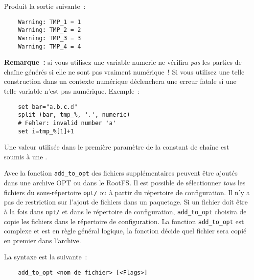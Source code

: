     Produit la sortie suivante~:

\begin{example}
\begin{verbatim}
    Warning: TMP_1 = 1
    Warning: TMP_2 = 2
    Warning: TMP_3 = 3
    Warning: TMP_4 = 4
\end{verbatim}
\end{example}

    \textbf{Remarque~:} si vous utilisez une variable \og{}numeric\fg{}  ne
	vérifira \emph{pas} les parties de chaîne générés si elle ne sont pas vraiment numérique~!
	Si vous utilisez une telle construction dans un contexte numérique 
	déclenchera une erreur fatale si une telle variable n'est pas numérique. Exemple~:

\begin{example}
\begin{verbatim}
    set bar="a.b.c.d"
    split (bar, tmp_%, '.', numeric)
    # Fehler: invalid number 'a'
    set i=tmp_%[1]+1
\end{verbatim}
\end{example}

    Une valeur utilisée dans le première paramètre de la constant de chaîne est soumis à une
	.



   Avec la fonction \texttt{add\_to\_opt} des fichiers supplémentaires peuvent
   être ajoutés dans une archive OPT ou dans le RootFS. Il est possible de sélectionner
   \emph{tous} les fichiers du sous-répertoire \texttt{opt/} ou à partir du répertoire
   de configuration. Il n'y a pas de restriction sur l’ajout de fichiers dans un paquetage.
   Si un fichier doit être à la fois dans \texttt{opt/} et dans le répertoire de configuration,
   \texttt{add\_to\_opt} choisira de copie les fichiers dans le répertoire de configuration.
   La fonction \texttt{add\_to\_opt} est complexe et est en règle général logique, la fonction
   décide quel fichier sera copié en premier dans l'archive.

   La syntaxe est la suivante~:

\begin{example}
\begin{verbatim}
    add_to_opt <nom de fichier> [<Flags>]
\end{verbatim}
\end{example}

